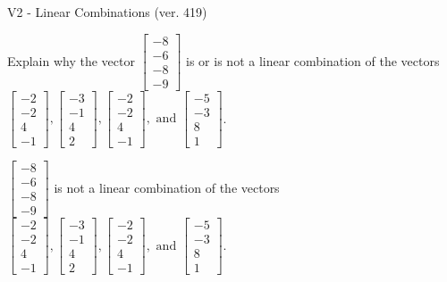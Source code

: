 \begin{exercise}
  \begin{exerciseTitle}V2 - Linear Combinations (ver. 419)\end{exerciseTitle}
  \begin{exerciseStatement}
    Explain why the vector \(\left[\begin{array}{c}
-8 \\
-6 \\
-8 \\
-9
\end{array}\right]\)  is or is not a linear 
	combination of the vectors \(\left[\begin{array}{c}
-2 \\
-2 \\
4 \\
-1
\end{array}\right] , \left[\begin{array}{c}
-3 \\
-1 \\
4 \\
2
\end{array}\right] , \left[\begin{array}{c}
-2 \\
-2 \\
4 \\
-1
\end{array}\right] , \text{ and } \left[\begin{array}{c}
-5 \\
-3 \\
8 \\
1
\end{array}\right]\).
	


  \end{exerciseStatement}
  \begin{exerciseAnswer}
   \(\left[\begin{array}{c}
-8 \\
-6 \\
-8 \\
-9
\end{array}\right]\) 
  	 is not  
	a linear combination of the vectors \(\left[\begin{array}{c}
-2 \\
-2 \\
4 \\
-1
\end{array}\right] , \left[\begin{array}{c}
-3 \\
-1 \\
4 \\
2
\end{array}\right] , \left[\begin{array}{c}
-2 \\
-2 \\
4 \\
-1
\end{array}\right] , \text{ and } \left[\begin{array}{c}
-5 \\
-3 \\
8 \\
1
\end{array}\right]\).


\end{exerciseAnswer}
\end{exercise}
